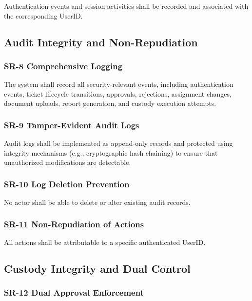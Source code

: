 \documentclass[12pt,a4paper]{report}
\begin{document}
Authentication events and session activities shall be recorded and associated with the corresponding UserID.


\subsection{Audit Integrity and Non-Repudiation}

\subsubsection{SR-8 Comprehensive Logging}

The system shall record all security-relevant events, including authentication events, ticket lifecycle transitions, approvals, rejections, assignment changes, document uploads, report generation, and custody execution attempts.

\subsubsection{SR-9 Tamper-Evident Audit Logs}

Audit logs shall be implemented as append-only records and protected using integrity mechanisms (e.g., cryptographic hash chaining) to ensure that unauthorized modifications are detectable.

\subsubsection{SR-10 Log Deletion Prevention}

No actor shall be able to delete or alter existing audit records.

\subsubsection{SR-11 Non-Repudiation of Actions}

All actions shall be attributable to a specific authenticated UserID.

\subsection{Custody Integrity and Dual Control}

\subsubsection{SR-12 Dual Approval Enforcement}
\end{document}
